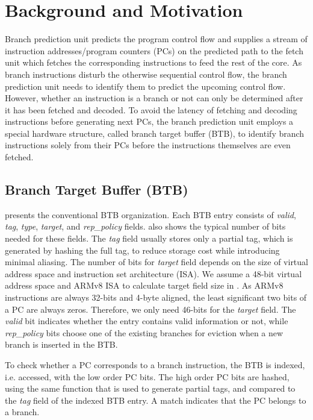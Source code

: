 \section{Background and Motivation}
\label{sec:background}

Branch prediction unit predicts the program control flow and supplies a stream of instruction addresses/program counters (PCs) on the predicted path to the fetch unit which fetches the corresponding instructions to feed the rest of the core. As branch instructions disturb the otherwise sequential control flow, the branch prediction unit needs to identify them to predict the upcoming control flow. However, whether an instruction is a branch or not can only be determined after it has been fetched and decoded. To avoid the latency of fetching and decoding instructions before generating next PCs, the branch prediction unit employs a special hardware structure, called branch target buffer (BTB), to identify branch instructions solely from their PCs before the instructions themselves are even fetched.

\subsection{Branch Target Buffer (BTB)}
 presents the conventional BTB organization. Each BTB entry consists of \textit{valid}, \textit{tag}, \textit{type}, \textit{target}, and \textit{rep\_policy} fields.  also shows the typical number of bits needed for these fields. The \textit{tag} field usually stores only a partial tag, which is generated by hashing the full tag, to reduce storage cost while introducing minimal aliasing. The number of bits for \textit{target} field depends on the size of virtual address space and instruction set architecture (ISA). We assume a 48-bit virtual address space and ARMv8 ISA to calculate target field size in . As ARMv8 instructions are always 32-bits and 4-byte aligned, the least significant two bits of a PC are always zeros. Therefore, we only need 46-bits for the \textit{target} field. The \textit{valid} bit indicates whether the entry contains valid information or not, while \textit{rep\_policy} bits choose one of the existing branches for eviction when a new branch is inserted in the BTB.

To check whether a PC corresponds to a branch instruction, the BTB is indexed, i.e. accessed, with the low order PC bits. The high order PC bits are hashed, using the same function that is used to generate partial tags, and compared to the \textit{tag} field of the indexed BTB entry. A match indicates that the PC belongs to a branch. 


